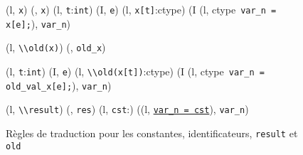 \begin{figure*}[h!]
  \scriptsize{
    {
      {}
      {(l, \mbox{\lstinline'x'}) (\emptylist, \mbox{\lstinline'x'})}{}
    }
    {
      {(l, \mbox{\lstinline't'}:\mbox{\lstinline'int'}) 
        (I, \mbox{\lstinline'e'})}
      {(l, \mbox{\lstinline'x[t]'}:ctype) 
        (I \concat (l, ctype~\mbox{\lstinline'var_n = x[e];'}),
        \mbox{\lstinline'var_n'})
      }{}
    }

    {
      {}
      {(l, \mbox{\lstinline'\\old(x)'}) 
        (\emptylist, \mbox{\lstinline'old_x'})}{}
    }

    {
      {(l, \mbox{\lstinline't'}:\mbox{\lstinline'int'}) 
        (I, \mbox{\lstinline'e'})}
      {(l, \mbox{\lstinline'\\old(x[t])'}:ctype) 
        (I \concat (l, ctype~\mbox{\lstinline'var_n = old_val_x[e];'}),
        \mbox{\lstinline'var_n'})
      }{}
    }

    {
      {}
      {(l, \mbox{\lstinline'\\result'}) 
        (\emptylist, \mbox{\lstinline'res'})}{}
    }
    {
      {}
      {(l, \mbox{\lstinline'cst'}:) 
        ((l, \underline{\Zinit\mbox{\lstinline'var_n = cst'}}\semicolon),
        \mbox{\lstinline'var_n'})}{}
    }
  }
  \caption{Règles de traduction pour les constantes, identificateurs,
    \lstinline'result' et \lstinline'old'}
  \label{fig:const-id}
\end{figure*}
